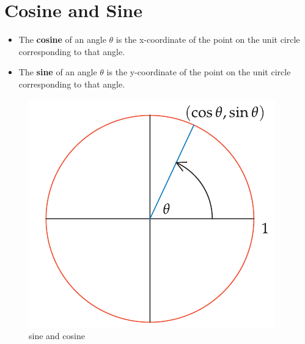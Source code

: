\section{Cosine and Sine}
\begin{itemize}
    \item The \textbf{cosine} of an angle $\theta$ is the x-coordinate of the point on the unit circle corresponding to that angle.
    \item The \textbf{sine} of an angle $\theta$ is the y-coordinate of the point on the unit circle corresponding to that angle.
\end{itemize}
\begin{figure}[h]
    \centering
    \includegraphics[scale=0.22]{pics/7.png}
    \caption{sine and cosine}
\end{figure}

